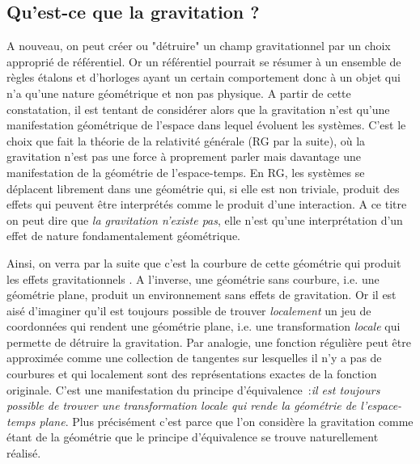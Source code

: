 \subsection{Qu'est-ce que la gravitation ?}
A nouveau, on peut créer ou "détruire" un champ gravitationnel par un choix approprié de référentiel. Or un référentiel pourrait se résumer à un ensemble de règles étalons et d'horloges ayant un certain comportement donc à un objet qui n'a qu'une nature géométrique et non pas physique. A partir de cette constatation, il est tentant de considérer alors que la gravitation n'est qu'une manifestation géométrique de l'espace dans lequel évoluent les systèmes. C'est le choix que fait la théorie de la relativité générale (RG par la suite), où la gravitation n'est pas une force à proprement parler mais davantage une manifestation de la géométrie de l'espace-temps. En RG, les systèmes se déplacent librement dans une géométrie qui, si elle est non triviale, produit des effets qui peuvent être interprétés comme le produit d'une interaction. A ce titre on peut dire que \textit{la gravitation n'existe pas}, elle n'est qu'une interprétation d'un effet de nature fondamentalement géométrique. 

Ainsi, on verra par la suite que c'est la courbure de cette géométrie qui produit les effets gravitationnels . A l'inverse, une géométrie sans courbure, i.e. une géométrie plane, produit un environnement sans effets de gravitation. Or il est aisé d'imaginer qu'il est toujours possible de trouver \textit{localement} un jeu de coordonnées qui rendent une géométrie plane, i.e. une transformation \textit{locale} qui permette de détruire la gravitation. Par analogie, une fonction régulière peut être approximée comme une collection de tangentes sur lesquelles il n'y a pas de courbures et qui localement sont des représentations exactes de la fonction originale. C'est une manifestation du principe d'équivalence~:\textit{il est toujours possible de trouver une transformation locale qui rende la géométrie de l'espace-temps plane}. Plus précisément c'est parce que l'on considère la gravitation comme étant de la géométrie que le principe d'équivalence se trouve naturellement réalisé.

